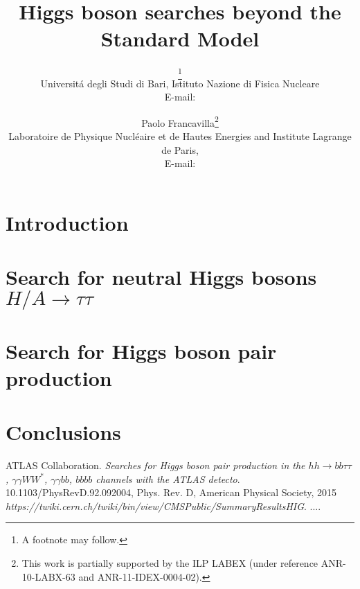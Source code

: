 \documentclass{PoS}
\title{Higgs boson searches beyond the Standard Model}
\author{\speaker{Claudio Caputo}\thanks{A footnote may follow.}\\
        Universit\'a degli Studi di Bari, Istituto Nazione di Fisica Nucleare\\
        E-mail: \email{claudio.caputo@cern.ch}}
\author{Paolo Francavilla\thanks{This work is partially supported by the ILP
LABEX (under reference ANR-10-LABX-63 and ANR-11-IDEX-0004-02).}\\
        Laboratoire de Physique Nucl\'eaire et de Hautes Energies and Institute Lagrange de Paris,\\
        E-mail: \email{paolo.francavilla@cern.ch}}
\begin{document}
\section{Introduction}


\section{Search for neutral  Higgs bosons $H/A \rightarrow \tau\tau$}


\newpage
\clearpage
\section{Search for Higgs boson pair production}


\newpage
\section{Conclusions}


\begin{thebibliography}{99}
 ATLAS Collaboration. \textsl{Searches for Higgs boson pair production in the $hh\ensuremath{\rightarrow}bb\ensuremath{\tau}\ensuremath{\tau}$, $\ensuremath{\gamma}\ensuremath{\gamma}W{W}^{*}$, $\ensuremath{\gamma}\ensuremath{\gamma}bb$, $bbbb$ channels with the ATLAS detecto}.
		\\10.1103/PhysRevD.92.092004, Phys. Rev. D, American Physical Society, 2015
 \textsl{https://twiki.cern.ch/twiki/bin/view/CMSPublic/SummaryResultsHIG}.
....

\end{thebibliography}
\end{document}
